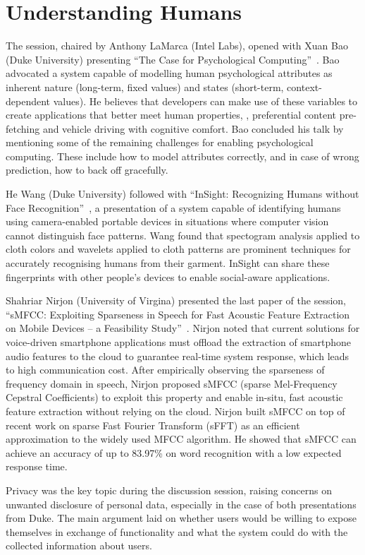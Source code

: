 \section{Understanding Humans}
\label{sec:humans}

The session, chaired by Anthony LaMarca (Intel Labs), opened with Xuan
Bao (Duke University) presenting ``The Case for Psychological
Computing''~\cite{bao13}. Bao advocated a system capable of modelling
human psychological
attributes as inherent nature (long-term, fixed values) and states
(short-term, context-dependent values). He believes that developers can
make use of these variables to create applications that better meet
human properties, \eg, preferential content pre-fetching and vehicle
driving with cognitive comfort. Bao concluded his talk by mentioning
some of the remaining challenges for enabling psychological computing.
These include how to model attributes correctly, and in case of wrong
prediction, how to back off gracefully.

He Wang (Duke University) followed with ``InSight: Recognizing Humans without Face
Recognition''~\cite{wang13}, a presentation of a system capable of
identifying humans using camera-enabled portable devices in situations
where computer vision cannot distinguish face patterns. Wang found that
spectogram analysis applied to cloth colors and wavelets applied to cloth
patterns are prominent techniques for accurately recognising humans from
their garment. InSight can share these fingerprints with other people's
devices to enable social-aware applications.

Shahriar Nirjon (University of Virgina) presented the last paper of
the session, ``sMFCC: Exploiting Sparseness in Speech for Fast Acoustic
Feature Extraction on Mobile Devices -- a Feasibility
Study''~\cite{nirjon13}. Nirjon
noted that current solutions for voice-driven smartphone applications
must offload the extraction of smartphone audio features to the cloud to
guarantee real-time system response, which leads to high communication
cost. After empirically observing the sparseness of frequency domain in
speech, Nirjon proposed sMFCC (sparse Mel-Frequency Cepstral
Coefficients) to exploit this property and enable in-situ, fast
acoustic feature extraction without relying on the cloud. Nirjon built
sMFCC on top of recent work on sparse Fast Fourier Transform (sFFT) as
an efficient approximation to the widely used MFCC algorithm. He showed
that sMFCC can achieve an accuracy of up to 83.97\% on word
recognition with a low expected response time.

Privacy was the key topic during the discussion session, raising
concerns on unwanted disclosure of personal data, especially in the case
of both presentations from Duke. The main argument laid on whether
users would be willing to expose themselves in exchange of functionality and
what the system could do with the collected information about users.
